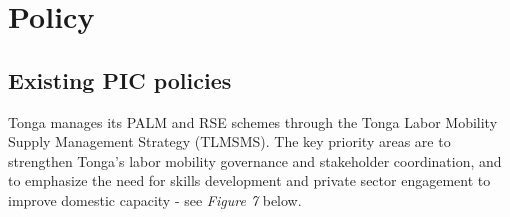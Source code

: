 \documentclass[9pt,a4paper,twocolumn,twoside]{tau-class/tau}
\begin{document}
\newpage

\section{Policy}
\subsection{Existing PIC policies}


Tonga manages its PALM and RSE schemes through the Tonga Labor Mobility Supply Management Strategy (TLMSMS). The key priority areas are to strengthen Tonga's labor mobility governance and stakeholder coordination, and to emphasize the need for skills development and private sector engagement to improve domestic capacity - see \textit{Figure 7} below.
\end{document}

